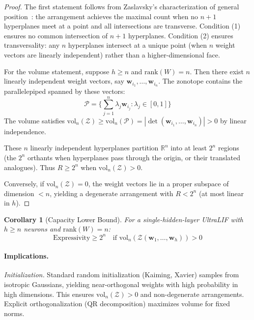 \documentclass{article}
\theoremstyle{plain}
\newtheorem{corollary}[theorem]{Corollary}
\theoremstyle{definition}
\theoremstyle{remark}
\begin{document}
\begin{proof}
The first statement follows from Zaslavsky's characterization of general position~\citep{zaslavsky1975}: the arrangement achieves the maximal count when no $n{+}1$ hyperplanes meet at a point and all intersections are transverse. Condition (1) ensures no common intersection of $n{+}1$ hyperplanes. Condition (2) ensures transversality: any $n$ hyperplanes intersect at a unique point (when $n$ weight vectors are linearly independent) rather than a higher-dimensional face.

For the volume statement, suppose $h \geq n$ and $\mathrm{rank}(W) = n$. Then there exist $n$ linearly independent weight vectors, say $\mathbf{w}_{i_1}, \ldots, \mathbf{w}_{i_n}$. The zonotope contains the parallelepiped spanned by these vectors:
\[
\mathcal{P} = \{\sum_{j=1}^n \lambda_j \mathbf{w}_{i_j} : \lambda_j \in [0,1]\}
\]
The volume satisfies $\mathrm{vol}_n(\mathcal{Z}) \geq \mathrm{vol}_n(\mathcal{P}) = |\det(\mathbf{w}_{i_1}, \ldots, \mathbf{w}_{i_n})| > 0$ by linear independence.

These $n$ linearly independent hyperplanes partition $\mathbb{R}^n$ into at least $2^n$ regions (the $2^n$ orthants when hyperplanes pass through the origin, or their translated analogues). Thus $R \geq 2^n$ when $\mathrm{vol}_n(\mathcal{Z}) > 0$.

Conversely, if $\mathrm{vol}_n(\mathcal{Z}) = 0$, the weight vectors lie in a proper subspace of dimension $< n$, yielding a degenerate arrangement with $R < 2^n$ (at most linear in $h$).
\end{proof}

\begin{corollary}[Capacity Lower Bound]
\label{cor:app-capacity-lower-bound}
For a single-hidden-layer UltraLIF with $h \geq n$ neurons and $\mathrm{rank}(W) = n$:
\[
\text{Expressivity} \geq 2^n \quad \text{if } \mathrm{vol}_n(\mathcal{Z}(\mathbf{w}_1, \ldots, \mathbf{w}_h)) > 0
\]
\end{corollary}

\paragraph{Implications.}

\textit{Initialization.} Standard random initialization (Kaiming, Xavier) samples from isotropic Gaussians, yielding near-orthogonal weights with high probability in high dimensions. This ensures $\mathrm{vol}_n(\mathcal{Z}) > 0$ and non-degenerate arrangements. Explicit orthogonalization (QR decomposition) maximizes volume for fixed norms.
\end{document}

